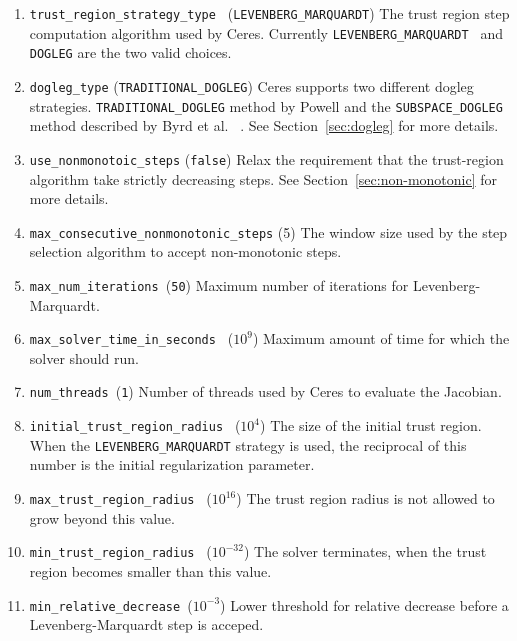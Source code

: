 \begin{enumerate}

\item{\texttt{trust\_region\_strategy\_type }}
  (\texttt{LEVENBERG\_MARQUARDT}) The  trust region step computation
  algorithm used by Ceres. Currently \texttt{LEVENBERG\_MARQUARDT }
  and \texttt{DOGLEG} are the two valid choices.

\item{\texttt{dogleg\_type}} (\texttt{TRADITIONAL\_DOGLEG})  Ceres
  supports two different dogleg strategies.
  \texttt{TRADITIONAL\_DOGLEG} method by Powell and the
  \texttt{SUBSPACE\_DOGLEG} method described by Byrd et al.
~\cite{byrd1988approximate}. See Section~\ref{sec:dogleg} for more details.

\item{\texttt{use\_nonmonotoic\_steps}} (\texttt{false})
Relax the requirement that the trust-region algorithm take strictly
decreasing steps. See Section~\ref{sec:non-monotonic} for more details.

\item{\texttt{max\_consecutive\_nonmonotonic\_steps}} (5)
The window size used by the step selection algorithm to accept
non-monotonic steps.

\item{\texttt{max\_num\_iterations }}(\texttt{50}) Maximum number of
  iterations for Levenberg-Marquardt.

\item{\texttt{max\_solver\_time\_in\_seconds }} ($10^9$) Maximum
  amount of time for which the solver should run.

\item{\texttt{num\_threads }}(\texttt{1}) Number of threads used by
  Ceres to evaluate the Jacobian.

\item{\texttt{initial\_trust\_region\_radius } ($10^4$)} The size of
  the initial trust region. When the \texttt{LEVENBERG\_MARQUARDT}
  strategy is used, the reciprocal of this number is the initial
  regularization parameter.

\item{\texttt{max\_trust\_region\_radius } ($10^{16}$)} The trust
  region radius is not allowed to grow beyond this value.

\item{\texttt{min\_trust\_region\_radius } ($10^{-32}$)} The solver
  terminates, when the trust region becomes smaller than this value.

\item{\texttt{min\_relative\_decrease }}($10^{-3}$) Lower threshold
  for relative decrease before a Levenberg-Marquardt step is acceped.


\end{enumerate}
